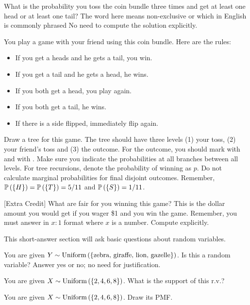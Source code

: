 \documentclass[12pt]{article}
\begin{document}
 What is the probability you toss the coin bundle three times and get at least one head or at least one tail? The word  here means non-exclusive or which in English is commonly phrased  No need to compute the solution explicitly.


 You play a game with your friend using this coin bundle. Here are the rules: 

\begin{itemize}
\item If you get a heads and he gets a tail, you win. 
\item If you get a tail and he gets a head, he wins. 
\item If you both get a head, you play again. 
\item If you both get a tail, he wins. 
\item If there is a side flipped, immediately flip again. 
\end{itemize}

Draw a tree for this game. The tree should have three levels (1) your toss, (2) your friend's toss and (3) the outcome. For the outcome, you should mark  with  and  with . Make sure you indicate the probabilities at all branches between all levels. For tree recursions, denote the probability of winning as $p$. Do not calculate marginal probabilities for final disjoint outcomes. Remember, $\mathbb{P}\left(\left\{H\right\}\right) = \mathbb{P}\left(\left\{T\right\}\right) = 5/11$ and $\mathbb{P}\left(\left\{S\right\}\right) = 1/11$.


 [Extra Credit]  What are fair  for you winning this game? This is the dollar amount you would get if you wager \$1 and you win the game. Remember, you must answer in $x : 1$ format where $x$ is a number. Compute explicitly. 

\eenum
\pagebreak

\problem This short-answer section will ask basic questions about random variables.


\benum
{} You are given $Y \sim \mathrm{Uniform}\left(\left\{\text{zebra, giraffe, lion, gazelle}\right\}\right)$. Is this a random variable? Answer yes or no; no need for justification.

 You are given $X \sim \mathrm{Uniform}\left(\left\{2,4,6,8\right\}\right)$. What is the support of this r.v.?


 You are given $X \sim \mathrm{Uniform}\left(\left\{2,4,6,8\right\}\right)$. Draw its PMF.
\end{document}
